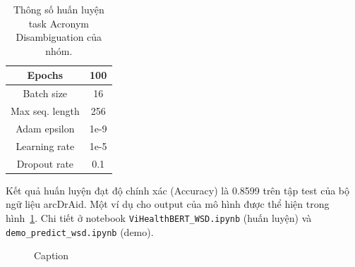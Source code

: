 \begin{table}
\centering
\begin{tabular}{|c|c|}
\hline
Epochs & 100 \\ \hline
Batch size & 16 \\ \hline
Max seq. length & 256 \\ \hline
Adam epsilon & 1e-9 \\ \hline
Learning rate & 1e-5 \\ \hline
Dropout rate & 0.1 \\ \hline
\end{tabular}
\caption{Thông số huấn luyện task Acronym Disambiguation của nhóm.}
\label{tab:experiments-self-ad}
\end{table}

Kết quả huấn luyện đạt độ chính xác (Accuracy) là 0.8599 trên tập test của bộ ngữ liệu arcDrAid. Một ví dụ cho output của mô hình được thể hiện trong hình~\ref{fig:demo-wsd-output}. Chi tiết ở notebook \texttt{ViHealthBERT\_WSD.ipynb} (huấn luyện) và \texttt{demo\_predict\_wsd.ipynb} (demo).

\begin{figure}
\centering
{}
\caption{Caption}
\label{fig:demo-wsd-output}
\end{figure}